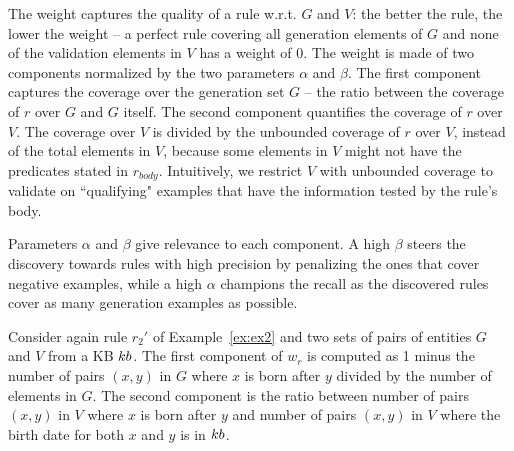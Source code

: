 The weight 
captures the quality of a rule w.r.t. $G$ and $V$: the better the rule, the lower the weight -- a perfect rule covering all generation elements of $G$ and none of the validation elements in $V$ has a weight of $0$.
%
The weight is made of two components normalized by the two parameters $\alpha$ and $\beta$.
The first component captures the coverage over the generation set $G$ -- the ratio between the coverage of $r$ over $G$ and $G$ itself.
The second component quantifies the coverage of $r$ over $V$. The coverage over $V$ is divided by the unbounded coverage of $r$ over $V$, instead of the total elements in $V$, 
because some elements in $V$ might not have the predicates stated in $r_{body}$.
Intuitively, we restrict $V$ with unbounded coverage to validate on ``qualifying" examples that have the information tested by the rule's body.

Parameters $\alpha$ and $\beta$ give relevance to each component. A high $\beta$ steers the discovery towards rules with high precision by penalizing the ones that cover negative examples, %
while a high $\alpha$ champions the recall as the discovered rules cover as many generation examples as possible.

\begin{example}
	Consider again rule $r_2'$ of Example~\ref{ex:ex2} and two sets of pairs of entities $G$ and $V$ from a KB ${\sc kb}$. 
The first component of $w_r$ is computed as 1 minus the number of pairs $(x,y)$ in $G$ where
		$x$ is born after $y$ divided by the number of elements in $G$.
The second component is the ratio between number of pairs $(x,y)$ in $V$ where $x$ is born after $y$ and number of pairs $(x,y)$ in $V$ where the birth date for both $x$ and $y$ is in ${\sc kb}$.
\end{example}

